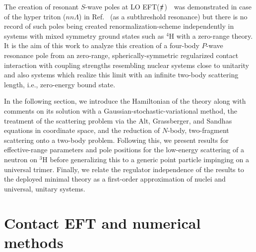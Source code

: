 \documentclass[aps,onecolumn,preprintnumbers,amsmath,amssymb,nofootinbib,superscriptaddress,notitlepage]{revtex4-1}
\newcommand{\eftnopi}{\mbox{EFT($\slashed{\pi}$) }}
\begin{document}
The creation of resonant $S$-wave poles at LO \eftnopi~was demonstrated in case of the
hyper triton ($nn\Lambda$) in Ref.~\cite{Schafer:2020rba} (as a subthreshold resonance) but
there is no record of such poles being created renormalization-scheme independently
in systems with mixed symmetry ground states
such as $^4$H with a zero-range theory. 
It is the aim of this work to analyze this creation of a four-body $P$-wave resonance
pole from an zero-range, spherically-symmetric regularized contact interaction with
coupling strengths resembling nuclear systems close to unitarity and also systems which
realize this limit with an infinite two-body scattering length, i.e., zero-energy bound
state.

In the following section, we introduce the Hamiltonian of the theory along with
comments on its solution with a Gaussian-stochastic-variational method, the
treatment of the scattering problem via the Alt, Grassberger, and Sandhas equations
in coordinate space, and the reduction of $N$-body, two-fragment scattering onto a
two-body problem.
Following this, we present results for effective-range parameters and pole positions
for the low-energy scattering of a neutron on $^3$H before generalizing this to a
generic point particle impinging on a universal trimer.
Finally, we relate the regulator independence of the results to the deployed minimal
theory as a first-order approximation of nuclei and universal, unitary systems.

\section{Contact EFT and numerical methods}
\end{document}
